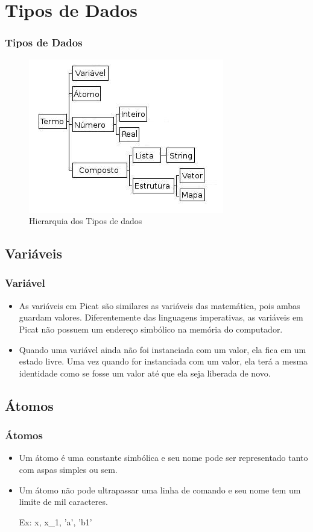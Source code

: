 \documentclass[10pt]{beamer}
\begin{document}

\section{Tipos de Dados}
\begin{frame}
\frametitle{Tipos de Dados}
\begin{figure}[!ht]
\centering
\includegraphics[width=.6\textwidth]{figures/tipos_dados_picat_traduzido.jpg}
\caption{Hierarquia dos Tipos de dados}
\label{Hiera}
\end{figure}
\end{frame}


\subsection{Variáveis}
\begin{frame}
    \frametitle{Variável}
    \begin{itemize}
     \item As variáveis em Picat são similares as variáveis das matemática, pois ambas guardam valores. 
	   Diferentemente das linguagens imperativas, as variáveis em Picat não possuem um endereço simbólico na memória do computador.
     \item Quando uma variável ainda não foi instanciada com um valor, ela fica em um estado livre. 
	   Uma vez quando for instanciada com um valor, ela terá a mesma identidade como se fosse um valor até que ela seja liberada de novo.
    \end{itemize}
\end{frame}

\subsection{Átomos}
\begin{frame}
    \frametitle{Átomos}
    \begin{itemize}
     \item Um átomo é uma constante simbólica e seu nome pode ser representado tanto com aspas simples ou sem. 
     \item Um átomo não pode ultrapassar uma linha de comando e seu nome tem um limite de mil caracteres. 
    
    Ex: x, x\_1, ’a’, ’b1’
    \end{itemize}
\end{frame}
\end{document}
